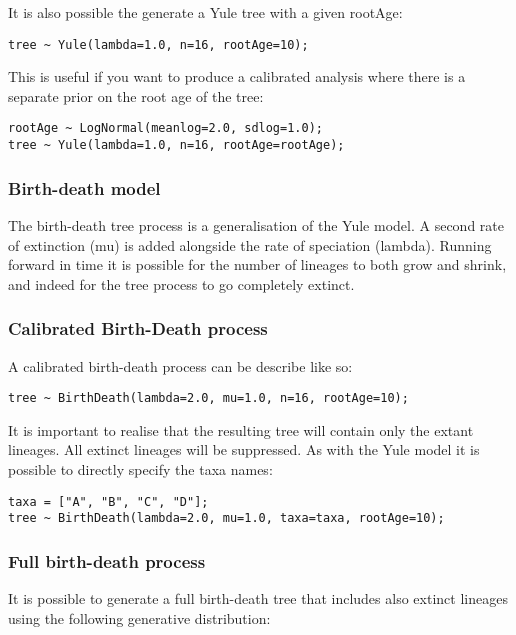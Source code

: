 \documentclass[oneside]{article}
\begin{document}
It is also possible the generate a Yule tree with a given rootAge:

\begin{verbatim}
tree ~ Yule(lambda=1.0, n=16, rootAge=10);
\end{verbatim}

This is useful if you want to produce a calibrated analysis where there is a separate prior on the root age of the tree:

\begin{verbatim}
rootAge ~ LogNormal(meanlog=2.0, sdlog=1.0);
tree ~ Yule(lambda=1.0, n=16, rootAge=rootAge);
\end{verbatim}

\subsubsection{Birth-death model}

The birth-death tree process is a generalisation of the Yule model. A second rate of extinction (mu) is added alongside
the rate of speciation (lambda). Running forward in time it is possible for the number of lineages to both grow and 
shrink, and indeed for the tree process to go completely extinct. 

\subsubsection{Calibrated Birth-Death process}

A calibrated birth-death process can be describe like so:

\begin{verbatim}
tree ~ BirthDeath(lambda=2.0, mu=1.0, n=16, rootAge=10);
\end{verbatim}

It is important to realise that the resulting tree will contain only the extant lineages. All extinct lineages will be
suppressed. As with the Yule model it is possible to directly specify the taxa names:

\begin{verbatim}
taxa = ["A", "B", "C", "D"];
tree ~ BirthDeath(lambda=2.0, mu=1.0, taxa=taxa, rootAge=10);
\end{verbatim}

\subsubsection{Full birth-death process}

It is possible to generate a full birth-death tree that includes also extinct lineages using the following generative
distribution:
\end{document}
